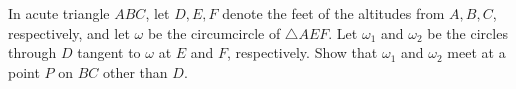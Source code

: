 In acute triangle $ABC$, let $D,E,F$ denote the feet of the altitudes from $A,B,C$, respectively, and let $\omega$ be the circumcircle of $\triangle AEF$. Let $\omega_1$ and $\omega_2$ be the circles through $D$ tangent to $\omega$ at $E$ and $F$, respectively. Show that $\omega_1$ and $\omega_2$ meet at a point $P$ on $BC$ other than $D$.